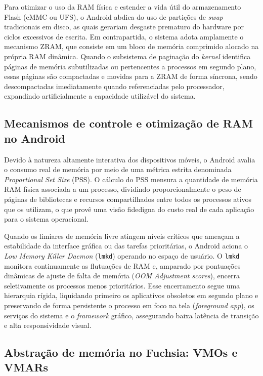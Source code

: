 \documentclass[12pt,a4paper]{article}
\begin{document}
Para otimizar o uso da RAM física e estender a vida útil do armazenamento Flash
(eMMC ou UFS), o Android abdica do uso de partições de \emph{swap} tradicionais
em disco, as quais gerariam desgaste prematuro do hardware por ciclos excessivos
de escrita. Em contrapartida, o sistema adota amplamente o mecanismo ZRAM, que
consiste em um bloco de memória comprimido alocado na própria RAM dinâmica.
Quando o subsistema de paginação do \emph{kernel} identifica páginas de memória
subutilizadas ou pertencentes a processos em segundo plano, essas páginas são
compactadas e movidas para a ZRAM de forma síncrona, sendo descompactadas
imediatamente quando referenciadas pelo processador, expandindo artificialmente
a capacidade utilizável do sistema.

\subsection{Mecanismos de controle e otimização de RAM no Android}

Devido à natureza altamente interativa dos dispositivos móveis, o Android avalia
o consumo real de memória por meio de uma métrica estrita denominada
\emph{Proportional Set Size} (PSS). O cálculo do PSS mensura a quantidade de
memória RAM física associada a um processo, dividindo proporcionalmente o peso
de páginas de bibliotecas e recursos compartilhados entre todos os processos
ativos que os utilizam, o que provê uma visão fidedigna do custo real de cada
aplicação para o sistema operacional.

Quando os limiares de memória livre atingem níveis críticos que ameaçam a
estabilidade da interface gráfica ou das tarefas prioritárias, o Android aciona
o \emph{Low Memory Killer Daemon} (\texttt{lmkd}) operando no espaço de usuário.
O \texttt{lmkd} monitora continuamente as flutuações de RAM e, amparado por
pontuações dinâmicas de ajuste de falta de memória (\emph{OOM Adjustment
scores}), encerra seletivamente os processos menos prioritários. Esse
encerramento segue uma hierarquia rígida, liquidando primeiro os aplicativos
obsoletos em segundo plano e preservando de forma persistente o processo em foco
na tela (\emph{foreground app}), os serviços do sistema e o \emph{framework}
gráfico, assegurando baixa latência de transição e alta responsividade visual.

\subsection{Abstração de memória no Fuchsia: VMOs e VMARs}
\end{document}
